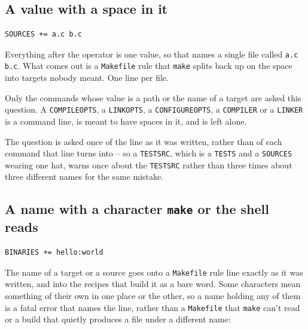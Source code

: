 \documentclass{article}
\begin{document}
\subsection{A value with a space in it}

\begin{verbatim}
SOURCES += a.c b.c
\end{verbatim}

Everything after the operator is one value, so that names a single
file called \texttt{a.c b.c}.  What comes out is a \texttt{Makefile}
rule that \texttt{make} splits back up on the space into targets
nobody meant.  One line per file.

Only the commands whose value is a path or the name of a target are
asked this question.  A \texttt{COMPILEOPTS}, a \texttt{LINKOPTS}, a
\texttt{CONFIGUREOPTS}, a \texttt{COMPILER} or a \texttt{LINKER} is a
command line, is meant to have spaces in it, and is left alone.

The question is asked once of the line as it was written, rather than
of each command that line turns into -- so a \texttt{TESTSRC}, which
is a \texttt{TESTS} and a \texttt{SOURCES} wearing one hat, warns once
about the \texttt{TESTSRC} rather than three times about three
different names for the same mistake.

\subsection{A name with a character \texttt{make} or the shell reads
  \label{cmd:make-special}}

\begin{verbatim}
BINARIES += hello:world
\end{verbatim}

The name of a target or a source goes onto a \texttt{Makefile} rule
line exactly as it was written, and into the recipes that build it as
a bare word.  Some characters mean something of their own in one place
or the other, so a name holding any of them is a fatal error that
names the line, rather than a \texttt{Makefile} that \texttt{make}
can't read or a build that quietly produces a file under a different
name:
\end{document}
